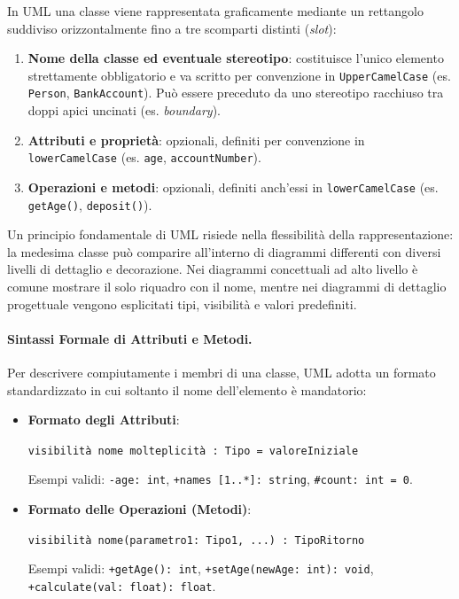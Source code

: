 \documentclass[12pt]{extarticle}
\begin{document}
\noindent In UML una classe viene rappresentata graficamente mediante un rettangolo suddiviso orizzontalmente fino a tre scomparti distinti (\textit{slot}):
\begin{enumerate}
    \item \textbf{Nome della classe ed eventuale stereotipo}: costituisce l'unico elemento strettamente obbligatorio e va scritto per convenzione in \texttt{UpperCamelCase} (es. \texttt{Person}, \texttt{BankAccount}). Può essere preceduto da uno stereotipo racchiuso tra doppi apici uncinati (es. \guillemotleft\textit{boundary}\guillemotright).
    \item \textbf{Attributi e proprietà}: opzionali, definiti per convenzione in \texttt{lowerCamelCase} (es. \texttt{age}, \texttt{accountNumber}).
    \item \textbf{Operazioni e metodi}: opzionali, definiti anch'essi in \texttt{lowerCamelCase} (es. \texttt{getAge()}, \texttt{deposit()}).
\end{enumerate}

\noindent Un principio fondamentale di UML risiede nella flessibilità della rappresentazione: la medesima classe può comparire all'interno di diagrammi differenti con diversi livelli di dettaglio e decorazione. Nei diagrammi concettuali ad alto livello è comune mostrare il solo riquadro con il nome, mentre nei diagrammi di dettaglio progettuale vengono esplicitati tipi, visibilità e valori predefiniti.

\paragraph{Sintassi Formale di Attributi e Metodi.}
Per descrivere compiutamente i membri di una classe, UML adotta un formato standardizzato in cui soltanto il nome dell'elemento è mandatorio:
\begin{itemize}
    \item \textbf{Formato degli Attributi}:
    \begin{center}
        \texttt{visibilità nome molteplicità : Tipo = valoreIniziale}
    \end{center}
    Esempi validi: \texttt{-age: int}, \texttt{+names [1..*]: string}, \texttt{\#count: int = 0}.
    \item \textbf{Formato delle Operazioni (Metodi)}:
    \begin{center}
        \texttt{visibilità nome(parametro1: Tipo1, ...) : TipoRitorno}
    \end{center}
    Esempi validi: \texttt{+getAge(): int}, \texttt{+setAge(newAge: int): void}, \texttt{+calculate(val: float): float}.
\end{itemize}
\end{document}
